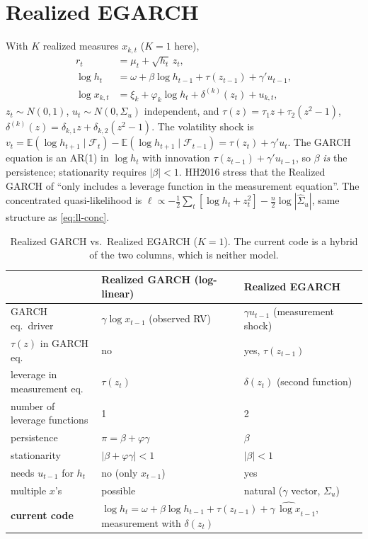 \documentclass[11pt]{article}
\newcommand{\F}{\mathcal{F}}
\newcommand{\E}{\mathbb{E}}
\begin{document}
\section{Realized EGARCH \cite{HH2016}}
With $K$ realized measures $x_{k,t}$ ($K=1$ here),
\begin{align}
r_t &= \mu_t + \sqrt{h_t}\,z_t, \label{eq:reg-ret}\\
\log h_t &= \omega + \beta\log h_{t-1} + \tau(z_{t-1}) + \gamma' u_{t-1}, \label{eq:reg-garch}\\
\log x_{k,t} &= \xi_k + \varphi_k \log h_t + \delta^{(k)}(z_t) + u_{k,t}, \label{eq:reg-meas}
\end{align}
$z_t\sim N(0,1)$, $u_t\sim N(0,\Sigma_u)$ independent, and
$\tau(z)=\tau_1 z+\tau_2(z^2-1)$, $\delta^{(k)}(z)=\delta_{k,1}z+\delta_{k,2}(z^2-1)$.
The volatility shock is $v_t=\E(\log h_{t+1}\mid\F_t)-\E(\log h_{t+1}\mid\F_{t-1})=\tau(z_t)+\gamma'u_t$.
The GARCH equation is an AR(1) in $\log h_t$ with innovation $\tau(z_{t-1})+\gamma'u_{t-1}$,
so $\beta$ \emph{is} the persistence; stationarity requires $|\beta|<1$. HH2016 stress that
the Realized GARCH of \cite{HHS2012} ``only includes a leverage function in the measurement
equation''. The concentrated quasi-likelihood is
$\ell\propto-\frac12\sum_t[\log h_t+z_t^2]-\frac n2\log|\hat\Sigma_u|$, same structure as
\eqref{eq:ll-conc}.

\begin{table}[h]
\centering\small
\caption{Realized GARCH vs.\ Realized EGARCH ($K=1$). The current code is a hybrid of the two
columns, which is neither model.}
\label{tab:compare}
\begin{tabular}{@{}lll@{}}
\toprule
& Realized GARCH (log-linear) \cite{HHS2012} & Realized EGARCH \cite{HH2016}\\
\midrule
GARCH eq.\ driver & $\gamma\log x_{t-1}$ (observed RV) & $\gamma u_{t-1}$ (measurement shock)\\
$\tau(z)$ in GARCH eq. & no & yes, $\tau(z_{t-1})$\\
leverage in measurement eq. & $\tau(z_t)$ & $\delta(z_t)$ (second function)\\
number of leverage functions & 1 & 2\\
persistence & $\pi=\beta+\varphi\gamma$ & $\beta$\\
stationarity & $|\beta+\varphi\gamma|<1$ & $|\beta|<1$\\
needs $u_{t-1}$ for $h_t$ & no (only $x_{t-1}$) & yes\\
multiple $x$'s & possible & natural ($\gamma$ vector, $\Sigma_u$)\\
\midrule
\textbf{current code} & \multicolumn{2}{l}{$\log h_t=\omega+\beta\log h_{t-1}+\tau(z_{t-1})+\gamma\,\widehat{\log x}_{t-1}$, measurement with $\delta(z_t)$}\\
\bottomrule
\end{tabular}
\end{table}
\end{document}
